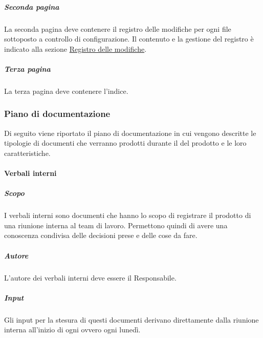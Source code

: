 \subparagraph{Seconda pagina}
La seconda pagina deve contenere il registro delle modifiche per ogni file sottoposto a controllo di configurazione.
Il contenuto e la gestione del registro è indicato alla sezione \hyperref[par:registro_delle_modifiche]{Registro delle modifiche}.

\subparagraph{Terza pagina}
La terza pagina deve contenere l'indice.

\subsubsection{Piano di documentazione}
\label{subsubsec:piano_documentazione}
Di seguito viene riportato il piano di documentazione in cui vengono descritte le tipologie di documenti che verranno prodotti durante il  del prodotto e le loro caratteristiche.

\paragraph{Verbali interni}

\subparagraph{Scopo}
I verbali interni sono documenti che hanno lo scopo di registrare il prodotto di una riunione interna al team di lavoro.
Permettono quindi di avere una conoscenza condivisa delle decisioni prese e delle cose da fare.

\subparagraph{Autore}
L'autore dei verbali interni deve essere il Responsabile.

\subparagraph{Input}
Gli input per la stesura di questi documenti derivano direttamente dalla riunione interna all'inizio di ogni  ovvero ogni lunedì.

